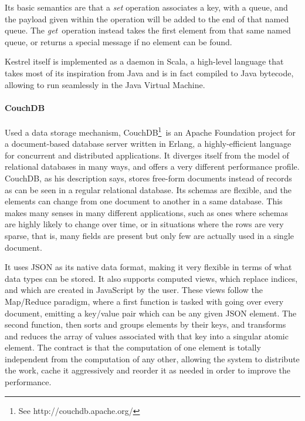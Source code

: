Its basic semantics are that a \emph{set} operation associates a key, with a queue, and the payload given within the operation will be added to the end of that named queue. The \emph{get}\ operation instead takes the first element from that same named queue, or returns a special message if no element can be found.

Kestrel itself is implemented as a daemon in Scala, a high-level language that takes most of its inspiration from Java and is in fact compiled to Java bytecode, allowing to run seamlessly in the Java Virtual Machine.


\paragraph{CouchDB} %
\label{par:couchdb}

Used a data storage mechanism, CouchDB\footnote{See http://couchdb.apache.org/}\ is an Apache Foundation project for a document-based database server written in Erlang, a highly-efficient language for concurrent and distributed applications. It diverges itself from the model of relational databases in many ways, and offers a very different performance profile. CouchDB, as his description says, stores free-form documents instead of records as can be seen in a regular relational database. Its schemas are flexible, and the elements can change from one document to another in a same database. This makes many senses in many different applications, such as ones where schemas are highly likely to change over time, or in situations where the rows are very sparse, that is, many fields are present but only few are actually used in a single document.

It uses JSON as its native data format, making it very flexible in terms of what data types can be stored. It also supports computed views, which replace indices, and which are created in JavaScript by the user. These views follow the Map/Reduce paradigm, where a first function is tasked with going over every document, emitting a key/value pair which can be any given JSON element. The second function, then sorts and groups elements by their keys, and transforms and reduces the array of values associated with that key into a singular atomic element. The contract is that the computation of one element is totally independent from the computation of any other, allowing the system to distribute the work, cache it aggressively and reorder it as needed in order to improve the performance.

